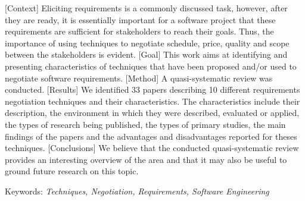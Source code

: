 \documentclass[a4paper,oneside,12pt]{book}
\begin{document}
\thispagestyle{myheadings}

[Context] Eliciting requirements is a commonly discussed task, however, after they are
ready, it is essentially important for a software project that these requirements are sufficient for stakeholders to reach their goals. 
Thus, the importance of using techniques to negotiate schedule, price, quality and scope between the stakeholders is evident. 
[Goal] This work aims at identifying and presenting characteristics of techniques that have been proposed and/or used to negotiate software requirements. 
[Method] A quasi-systematic review was conducted. 
[Results] We identified 33 papers describing 10 different requirements
negotiation techniques and their characteristics. The characteristics include their description, the environment in which they were described, evaluated or applied, the types of research being published, the types of primary studies, the main findings 
of the papers and the advantages and disadvantages reported for theses techniques. 
[Conclusions] We believe that the conducted quasi-systematic review provides an interesting overview of the area and that it may also be useful to ground future research 
on this topic.

\bigskip
%

\noindent Keywords: \textit{Techniques, Negotiation, Requirements, Software
Engineering}


\tableofcontents

\thispagestyle{myheadings}



\listoffigures
{}

\thispagestyle{myheadings}


\listoftables
{}

\thispagestyle{myheadings}


\end{document}
